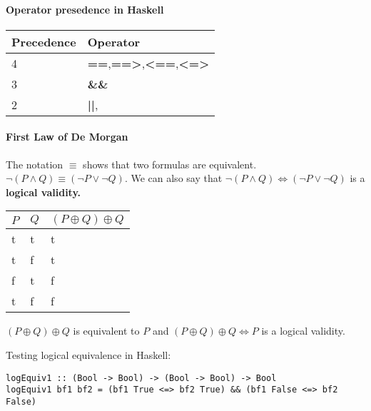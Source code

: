 \documentclass[11pt]{article}
\begin{document}
\paragraph{Operator presedence in Haskell} 
\begin{tabular}{|l|l|}
\hline
	Precedence & Operator\\
\hline
	4 & \textbf{==},\textbf{==>},\textbf{<==},\textbf{<=>}\\
\hline
	3 & \textbf{\&\&}\\
\hline
	2 & \textbf{||},\\
\hline
\end{tabular}

\paragraph{First Law of De Morgan}
The notation $\equiv$ shows that two formulas are equivalent. $\lnot (P \land Q) \equiv (\lnot P \lor \lnot Q)$. We can also say that $\lnot (P \land Q) \iff (\lnot P \lor \lnot Q)$ is a \textbf{logical validity.}


\begin{tabular}{l|l|l}
	$P$ & $Q$ & $(P \oplus Q) \oplus Q$\\ \hline
	t & t & t\\
	t & f & t\\
	f & t & f\\
	t & f & f\\
\end{tabular}

$(P \oplus Q) \oplus Q$ is equivalent to $P$ and $(P \oplus Q) \oplus Q \iff P$ is a logical validity.

Testing logical equivalence in Haskell:
\begin{verbatim}
logEquiv1 :: (Bool -> Bool) -> (Bool -> Bool) -> Bool
logEquiv1 bf1 bf2 = (bf1 True <=> bf2 True) && (bf1 False <=> bf2 False)
\end{verbatim}
\end{document}
